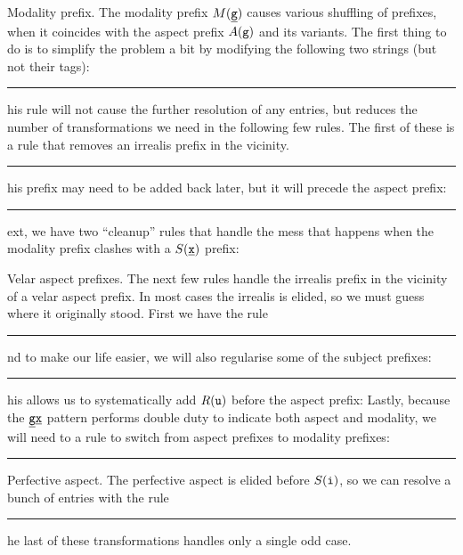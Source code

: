 \medskip\boldlabel Modality prefix. The modality prefix $\M{\g}$ causes various shuffling of prefixes, when it
coincides with the aspect prefix $\A{g}$ and its variants. The first thing to do is to simplify the problem a bit
by modifying the following two strings (but not their tags):
\rule{$\M{\x}\to \M{\g}, \A{k}\M{\g}\to \A{g}\M{\g}$}
This rule will not cause the further resolution of any entries, but reduces the number of transformations we need
in the following few rules. The first of these is a rule that removes an irrealis prefix in the vicinity.
\rule{$\A{g}\M{\g}\R{w}\to \A{g}\M{\g}, \A{g}\R{w}\M{\g} \to \A{g}\M{\g}$}
This prefix may need to be added back later, but it will precede the aspect prefix:
\rule{$\A{g}\M{\g}\to \R{w}\A{g}\M{\g}, \A{\g}\M{\g}\to \R{w}\A{\g}\M{\g}$}
Next, we have two ``cleanup'' rules that handle the mess that happens when the modality prefix clashes with
a $\S{\x}$ prefix:

\medskip\boldlabel Velar aspect prefixes. The next few rules handle the irrealis prefix in the vicinity of
a velar aspect prefix. In most cases the irrealis is elided, so we must guess where it originally stood.
First we have the rule
\rule{$\A{g}\R{o}\to \R{u}\A{g}$,}
and to make our life easier, we will also regularise some of the subject prefixes:
\rule{$\S{y}\to \S{i}, \S{ee}\to \S{i}, \S{yee}\to\S{yi}, \S{ye}\to\S{yi}, \S{too}\to\S{tu}, \S{\k}\to
\A{\g}\S{\x}$}
This allows us to systematically add $\R{u}$ before the aspect prefix:
Lastly, because the $\tt \g\x$ pattern performs double duty to indicate both aspect and modality, we will need
to a rule to switch from aspect prefixes to modality prefixes:
\rule{$\A{\g}\S{\x}\to \M{\g}\S{\x}$}

\medbreak\boldlabel Perfective aspect. The perfective aspect is elided before $\S{i}$,
so we can resolve a bunch of entries
with the rule
\rule{$\Q{a}\S{i}\to \Q{a}\A{wu}\S{i}, \Q{ka}\S{i}\to \Q{ka}\A{wu}\S{i},\Q{\x'a}\S{i}\to \Q{\x'e}\A{wu}\S{i},$
\tinyskip
$\Q{ji}\S{i}\to \Q{ji}\A{wu}\S{i}, \Q{tu}\S{i}\to \Q{tu}\A{wu}\S{i},\A{e}\S{e}\to \Q{a}\A{wu}\S{i}$.}
The last of these transformations handles only a single odd case.


